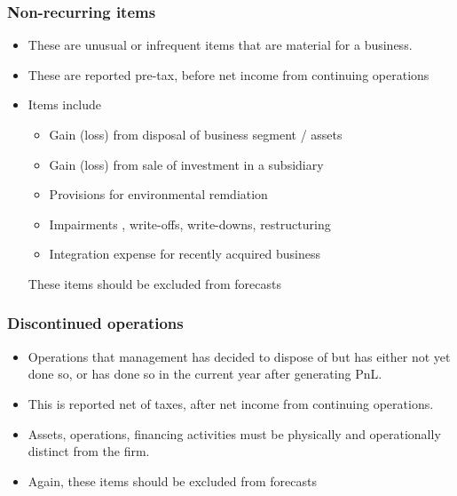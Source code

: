 \documentclass[../notes_compiled.tex]{subfiles}
\begin{document}
\subsubsection{Non-recurring items}
\begin{itemize}
\item These are unusual or infrequent items that are material for a business.
\item These are reported pre-tax, before net income from continuing operations
\item Items include
\begin{itemize}
\item Gain (loss) from disposal of business segment / assets
\item Gain (loss) from sale of investment in a subsidiary
\item Provisions for environmental remdiation
\item Impairments , write-offs, write-downs, restructuring
\item Integration expense for recently acquired business
\end{itemize}
These items should be excluded from forecasts
\end{itemize}

\subsubsection{Discontinued operations}
\begin{itemize}
\item Operations that management has decided to dispose of but has either not yet done so, or has done so in the current year after generating PnL.
\item This is reported net of taxes, after net income from continuing operations.
\item Assets, operations, financing activities must be physically and operationally distinct from the firm.
\item Again, these items should be excluded from forecasts
\end{itemize}
\end{document}
